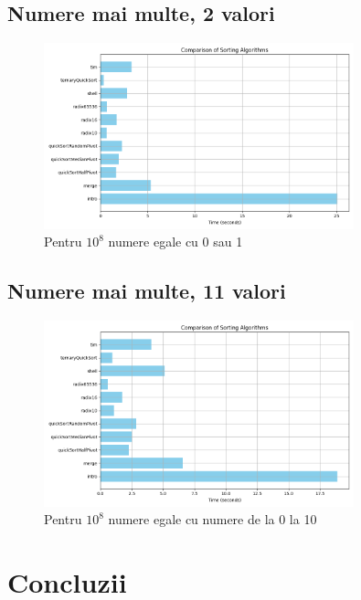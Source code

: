 \documentclass[12pt]{article}
\begin{document}
\subsection{Numere mai multe, 2 valori}
\begin{figure}[H]
    \centering
    \includegraphics[width=0.8\textwidth]{./img/img_20250417_023757.png} %
    \caption{Pentru $10^8$ numere egale cu 0 sau 1}
\end{figure}
\subsection{Numere mai multe, 11 valori}
\begin{figure}[H]
    \centering
    \includegraphics[width=0.8\textwidth]{./img/img_20250417_023946.png} %
    \caption{Pentru $10^8$ numere egale cu numere de la 0 la 10}
\end{figure}

\section{Concluzii}
\end{document}
